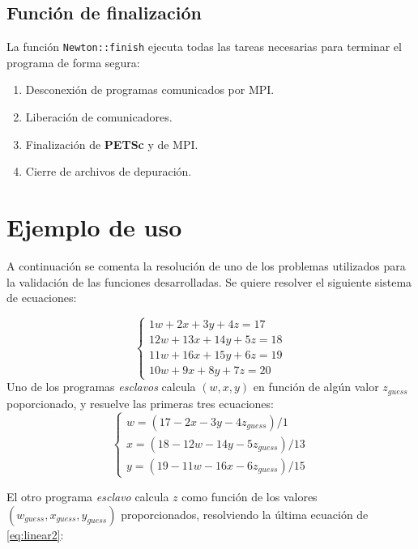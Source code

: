 \subsection*{Función de finalización}
\label{ap2:newton-finish}

La función \texttt{Newton::finish} ejecuta todas las tareas necesarias para terminar el programa de forma segura:
\begin{enumerate}
\item Desconexión de programas comunicados por MPI.
\item Liberación de comunicadores.
\item Finalización de \textbf{PETSc} y de MPI.
\item Cierre de archivos de depuración.
\end{enumerate}

\section{Ejemplo de uso}
\label{ap2:ejemplo}

A continuación se comenta la resolución de uno de los problemas utilizados para la validación de las funciones desarrolladas.
Se quiere resolver el siguiente sistema de ecuaciones:

\begin{equation}
\left\{\begin{matrix}
  1w +  2x +  3y +  4z = 17 \\
 12w + 13x + 14y +  5z = 18 \\
 11w + 16x + 15y +  6z = 19 \\
 10w +  9x +  8y +  7z = 20
\end{matrix}\right.
\label{eq:linear2}
\end{equation}
Uno de los programas \textit{esclavos} calcula $(w,x,y)$ en función de algún valor $z_{guess}$ poporcionado, y resuelve las primeras tres ecuaciones:
\begin{equation}
\left\{\begin{matrix}
 w = (17 -  2x -  3y - 4z_{guess})/ 1 \\
 x = (18 - 12w - 14y - 5z_{guess})/13 \\
 y = (19 - 11w - 16x - 6z_{guess})/15
\end{matrix}\right.
\label{eq:linear2a}
\end{equation}

El otro programa \textit{esclavo} calcula $z$ como función de los valores $(w_{guess},x_{guess},y_{guess})$ proporcionados, resolviendo la última ecuación de \ref{eq:linear2}:

